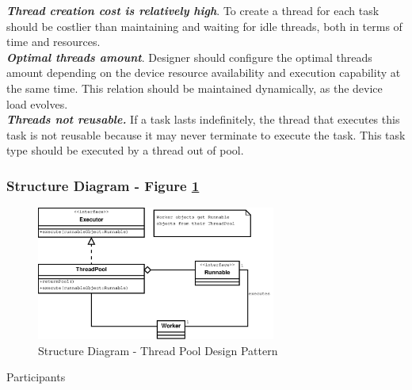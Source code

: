\noindent\textbf{\textit{Thread creation cost is relatively high}}. To create a thread for each task should be costlier than maintaining and waiting for idle threads, both in terms of time and resources.\\

\noindent\textbf{\textit{Optimal threads amount}}. Designer should configure the optimal threads amount depending on the device resource availability and execution capability at the same time. This relation should be maintained dynamically, as the device load evolves.\\

\noindent\textbf{\textit{Threads not reusable.}} If a task lasts indefinitely, the thread that executes this task is not reusable because it may never terminate to execute the task. This task type should be executed by a thread out of pool.

\subsubsection{Structure Diagram - Figure \ref{fig:str_diagram_tp}}

\begin{figure}
	\centering
	\includegraphics*[width=0.7\textwidth, keepaspectratio=false]{fig/image8.eps}
	\caption{Structure Diagram - Thread Pool Design Pattern}
	\label{fig:str_diagram_tp}
\end{figure}

\begin{description}
	\item[Participants]
\end{description}

